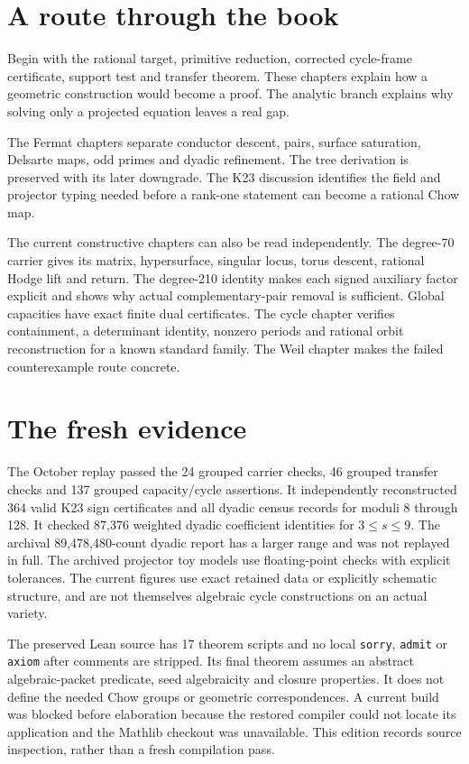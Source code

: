 \section*{A route through the book}
Begin with the rational target, primitive reduction, corrected cycle-frame certificate, support test and transfer theorem. These chapters explain how a geometric construction would become a proof. The analytic branch explains why solving only a projected equation leaves a real gap.

The Fermat chapters separate conductor descent, pairs, surface saturation, Delsarte maps, odd primes and dyadic refinement. The tree derivation is preserved with its later downgrade. The K23 discussion identifies the field and projector typing needed before a rank-one statement can become a rational Chow map.

The current constructive chapters can also be read independently. The degree-70 carrier gives its matrix, hypersurface, singular locus, torus descent, rational Hodge lift and return. The degree-210 identity makes each signed auxiliary factor explicit and shows why actual complementary-pair removal is sufficient. Global capacities have exact finite dual certificates. The cycle chapter verifies containment, a determinant identity, nonzero periods and rational orbit reconstruction for a known standard family. The Weil chapter makes the failed counterexample route concrete.

\section*{The fresh evidence}
The October replay passed the 24 grouped carrier checks, 46 grouped transfer checks and 137 grouped capacity/cycle assertions. It independently reconstructed 364 valid K23 sign certificates and all dyadic census records for moduli 8 through 128. It checked 87,376 weighted dyadic coefficient identities for $3\le s\le9$. The archival 89,478,480-count dyadic report has a larger range and was not replayed in full. The archived projector toy models use floating-point checks with explicit tolerances. The current figures use exact retained data or explicitly schematic structure, and are not themselves algebraic cycle constructions on an actual variety.

The preserved Lean source has 17 theorem scripts and no local \texttt{sorry}, \texttt{admit} or \texttt{axiom} after comments are stripped. Its final theorem assumes an abstract algebraic-packet predicate, seed algebraicity and closure properties. It does not define the needed Chow groups or geometric correspondences. A current build was blocked before elaboration because the restored compiler could not locate its application and the Mathlib checkout was unavailable. This edition records source inspection, rather than a fresh compilation pass.
